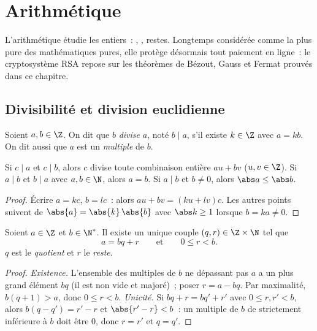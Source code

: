 \chapter{Arithmétique}\label{ch:g12:arith}

L'arithmétique étudie les entiers~: , , restes.
Longtemps considérée comme la plus pure des mathématiques pures, elle protège
désormais tout paiement en ligne~: le cryptosystème RSA repose sur les
théorèmes de Bézout, Gauss et Fermat prouvés dans ce chapitre.

\section{Divisibilité et division euclidienne}

\begin{definition}[Divisibilité]\label{def:g12:arith:divides}
Soient $a, b \in \Z$. On dit que $b$ \emph{divise} $a$,
noté $b \mid a$, s'il existe $k \in \Z$ avec $a = kb$. On dit aussi que $a$
est un \emph{multiple} de $b$.
\end{definition}

\begin{proposition}\label{prop:g12:arith:divprops}
Si $c \mid a$ et $c \mid b$, alors $c$ divise toute combinaison entière
$au + bv$ ($u, v \in \Z$). Si $a \mid b$ et $b \mid a$ avec
$a,b \in \N$, alors $a = b$. Si $a \mid b$ et $b \neq 0$, alors
$\abs a \leq \abs b$.
\end{proposition}

\begin{proof}
Écrire $a = kc$, $b = lc$~: alors $au + bv = (ku + lv)c$. Les autres points
suivent de $\abs{a} = \abs{k}\,\abs{b}$ avec $\abs k \geq 1$ lorsque
$b = ka \neq 0$.
\end{proof}

\begin{theorem}\label{thm:g12:arith:euclid}
Soient $a \in \Z$ et $b \in \N^*$. Il existe un unique couple
$(q, r) \in \Z \times \N$ tel que
\[
a = bq + r \qquad\text{et}\qquad 0 \leq r < b .
\]
$q$ est le \emph{quotient} et $r$ le \emph{reste}.
\end{theorem}

\begin{proof}
\emph{Existence.} L'ensemble des multiples de $b$ ne dépassant pas $a$ a un
plus grand élément $bq$ (il est non vide et majoré)~; poser $r = a - bq$.
Par maximalité, $b(q+1) > a$, donc $0 \leq r < b$.
\emph{Unicité.} Si $bq + r = bq' + r'$ avec $0 \leq r, r' < b$, alors
$b(q - q') = r' - r$ et $\abs{r' - r} < b$~: un multiple de $b$ de  strictement inférieure à $b$ doit être $0$, donc $r = r'$ et
$q = q'$.
\end{proof}

